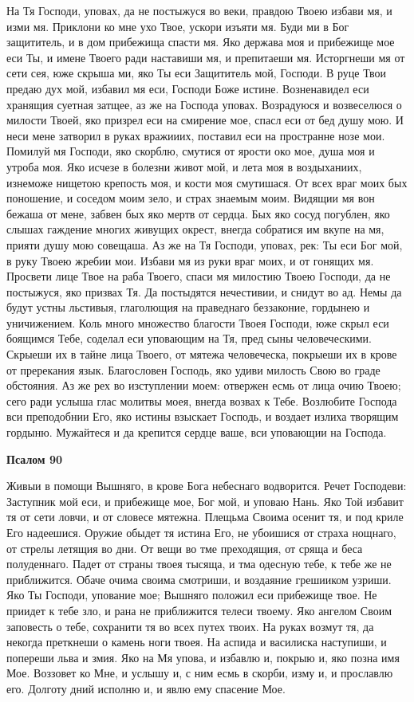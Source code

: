 На Тя Господи, уповах, да не постыжуся во веки, правдою Твоею избави мя, и изми мя. Приклони ко мне ухо Твое, ускори изъяти мя. Буди ми в Бог защититель, и в дом прибежища спасти мя. Яко держава моя и прибежище мое еси Ты, и имене Твоего ради наставиши мя, и препитаеши мя. Исторгнеши мя от сети сея, юже скрыша ми, яко Ты еси Защититель мой, Господи. В руце Твои предаю дух мой, избавил мя еси, Господи Боже истине. Возненавидел еси хранящия суетная затщее, аз же на Господа уповах. Возрадуюся и возвеселюся о милости Твоей, яко призрел еси на смирение мое, спасл еси от бед душу мою. И неси мене затворил в руках вражииих, поставил еси на пространне нозе мои. Помилуй мя Господи, яко скорблю, смутися от ярости око мое, душа моя и утроба моя. Яко исчезе в болезни живот мой, и лета моя в воздыханиих, изнеможе нищетою крепость моя, и кости моя смутишася. От всех враг моих бых поношение, и соседом моим зело, и страх знаемым моим. Видящии мя вон бежаша от мене, забвен бых яко мертв от сердца. Бых яко сосуд погублен, яко слышах гаждение многих живущих окрест, внегда собратися им вкупе на мя, прияти душу мою совещаша. Аз же на Тя Господи, уповах, рек: Ты еси Бог мой, в руку Твоею жребии мои. Избави мя из руки враг моих, и от гонящих мя. Просвети лице Твое на раба Твоего, спаси мя милостию Твоею Господи, да не постыжуся, яко призвах Тя. Да постыдятся нечестивии, и снидут во ад. Немы да будут устны льстивыя, глаголющия на праведнаго беззаконие, гордынею и уничижением. Коль много множество благости Твоея Господи, юже скрыл еси боящимся Тебе, соделал еси уповающим на Тя, пред сыны человеческими. Скрыеши их в тайне лица Твоего, от мятежа человеческа, покрыеши их в крове от пререкания язык. Благословен Господь, яко удиви милость Свою во граде обстояния. Аз же рех во изступлении моем: отвержен есмь от лица очию Твоею; сего ради услыша глас молитвы моея, внегда возвах к Тебе. Возлюбите Господа вси преподобнии Его, яко истины взыскает Господь, и воздает излиха творящим гордыню. Мужайтеся и да крепится сердце ваше, вси уповающии на Господа.







\bfseries Псалом 90\normalfont{}


Живыи в помощи Вышняго, в крове Бога небеснаго водворится. Речет Господеви: Заступник мой еси, и прибежище мое, Бог мой, и уповаю Нань. Яко Той избавит тя от сети ловчи, и от словесе мятежна. Плещьма Своима осенит тя, и под криле Его надеешися. Оружие обыдет тя истина Его, не убоишися от страха нощнаго, от стрелы летящия во дни. От вещи во тме преходящия, от сряща и беса полуденнаго. Падет от страны твоея тысяща, и тма одесную тебе, к тебе же не приближится. Обаче очима своима смотриши, и воздаяние грешииком узриши. Яко Ты Господи, упование мое; Вышняго положил еси прибежище твое. Не приидет к тебе зло, и рана не приближится телеси твоему. Яко ангелом Своим заповесть о тебе, сохранити тя во всех путех твоих. На руках возмут тя, да некогда преткнеши о камень ноги твоея. На аспида и василиска наступиши, и попереши льва и змия. Яко на Мя упова, и избавлю и, покрыю и, яко позна имя Мое. Воззовет ко Мне, и услышу и, с ним есмь в скорби, изму и, и прославлю его. Долготу дний исполню и, и явлю ему спасение Мое.


